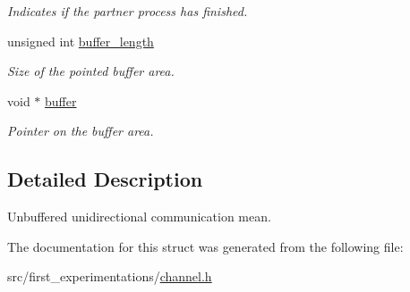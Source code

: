 \begin{DoxyCompactItemize}
\begin{DoxyCompactList}\small\item\em Indicates if the partner process has finished. \end{DoxyCompactList}\item 
\hypertarget{structchannel__t_a74cdeb703c27a61b90a0dc435cddec29}{unsigned int \hyperlink{structchannel__t_a74cdeb703c27a61b90a0dc435cddec29}{buffer\-\_\-length}}\label{structchannel__t_a74cdeb703c27a61b90a0dc435cddec29}

\begin{DoxyCompactList}\small\item\em Size of the pointed buffer area. \end{DoxyCompactList}\item 
\hypertarget{structchannel__t_a2aa54fcb1c2ef0675bb3b9b1b775b39e}{void $\ast$ \hyperlink{structchannel__t_a2aa54fcb1c2ef0675bb3b9b1b775b39e}{buffer}}\label{structchannel__t_a2aa54fcb1c2ef0675bb3b9b1b775b39e}

\begin{DoxyCompactList}\small\item\em Pointer on the buffer area. \end{DoxyCompactList}\end{DoxyCompactItemize}


\subsection{Detailed Description}
Unbuffered unidirectional communication mean. 

The documentation for this struct was generated from the following file\-:\begin{DoxyCompactItemize}
\item 
src/first\-\_\-experimentations/\hyperlink{channel_8h}{channel.\-h}\end{DoxyCompactItemize}
